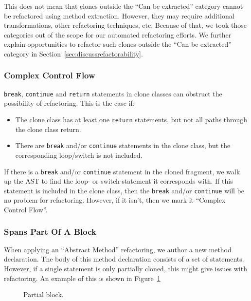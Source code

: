This does not mean that clones outside the ``Can be extracted'' category cannot be refactored using method extraction. However, they may require additional transformations, other refactoring techniques, etc. Because of that, we took those categories out of the scope for our automated refactoring efforts. We further explain opportunities to refactor such clones outside the ``Can be extracted'' category in Section~\ref{sec:discussrefactorability}.

\subsubsection{Complex Control Flow}
\texttt{break}, \texttt{continue} and \texttt{return} statements in clone classes can obstruct the possibility of refactoring. This is the case if:
\begin{itemize}
  \item The clone class has at least one \texttt{return} statements, but not all paths through the clone class return.
  \item There are \texttt{break} and/or \texttt{continue} statements in the clone class, but the corresponding loop/switch is not included.
\end{itemize}

If there is a \texttt{break} and/or \texttt{continue} statement in the cloned fragment, we walk up the AST to find the loop- or switch-statement it corresponds with. If this statement is included in the clone class, then the \texttt{break} and/or \texttt{continue} will be no problem for refactoring. However, if it isn't, then we mark it ``Complex Control Flow''.

\subsubsection{Spans Part Of A Block}
When applying an ``Abstract Method'' refactoring, we author a new method declaration. The body of this method declaration consists of a set of statements. However, if a single statement is only partially cloned, this might give issues with refactoring. An example of this is shown in Figure~\ref{fig:refactorabilitypartialblock}

\begin{figure}[H]
\begin{parcolumns}{2}
\end{parcolumns}
\caption{Partial block.}
\label{fig:refactorabilitypartialblock}
\end{figure}

